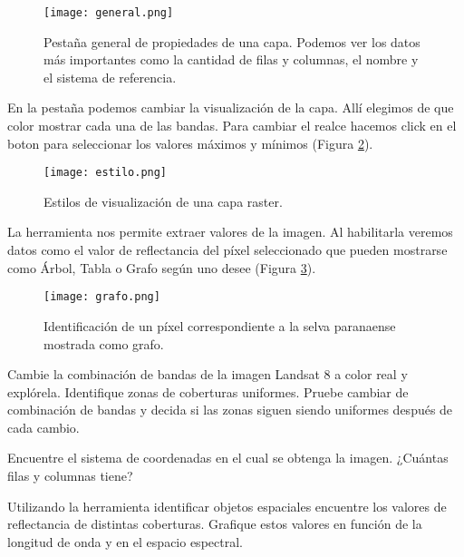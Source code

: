\begin{figure}[h!]
\begin{center}
    \texttt{[image: general.png]}
\end{center}
\caption{Pestaña general de propiedades de una capa. Podemos ver
    los datos m\'as importantes como la cantidad de filas y
    columnas, el nombre y el sistema de referencia.}
\label{fig:general}
\end{figure}

En la pestaña  podemos cambiar la visualizaci\'on de
la capa. All\'i elegimos de que color mostrar cada una de las
bandas. Para cambiar el realce hacemos
click en el boton  para seleccionar los valores m\'aximos y m\'inimos
(Figura \ref{fig:estilo}).

\begin{figure}[h!]
\begin{center}
    \texttt{[image: estilo.png]}
\end{center}
\caption{Estilos de visualizaci\'on de una capa raster.}
\label{fig:estilo}
\end{figure}

La herramienta  nos permite extraer valores
de la imagen. Al habilitarla veremos datos como el valor
de reflectancia del p\'ixel seleccionado que pueden mostrarse como
\'Arbol, Tabla o Grafo seg\'un uno desee (Figura \ref{fig:grafo}).

\begin{figure}[h!]
\begin{center}
    \texttt{[image: grafo.png]}
\end{center}
\caption{Identificaci\'on de un p\'ixel correspondiente a la selva paranaense
    mostrada como grafo. }
\label{fig:grafo}
\end{figure}

\begin{act}
    Cambie la combinación de bandas de la imagen Landsat 8 a color real y expl\'orela.
    Identifique zonas de coberturas uniformes. Pruebe cambiar de
    combinaci\'on de bandas y decida si las zonas siguen siendo uniformes
    despu\'es de cada cambio.
\end{act}

\begin{act}
    Encuentre el sistema de coordenadas en el cual se obtenga la imagen.
    ¿Cu\'antas filas y columnas tiene?
\end{act}

\begin{act}
   Utilizando la herramienta identificar objetos espaciales encuentre los
   valores de reflectancia de distintas coberturas. Grafique estos  valores en
   funci\'on de la longitud de onda y en el espacio espectral.
\end{act}

